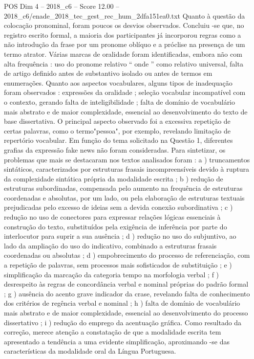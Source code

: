 \begin{textsample}{POS Dim 4 – 2018\_c6 – Score 12.00 – 2018\_c6/enade\_2018\_tec\_gest\_rec\_hum\_2dfa151ea0.txt}
Quanto à questão da colocação pronominal, foram poucos os desvios observados.
Concluiu -se que, no registro escrito formal, a maioria dos participantes já incorporou regras como a não introdução da frase por um pronome oblíquo e a próclise na presença de um termo atrator.
Várias marcas de oralidade foram identificadas, embora não com alta frequência : uso do pronome relativo “ onde ” como relativo universal, falta de artigo definido antes de substantivo isolado ou antes de termos em enumerações.
Quanto aos aspectos vocabulares, alguns tipos de inadequação foram observados : expressões da oralidade ; seleção vocabular incompatível com o contexto, gerando falta de inteligibilidade ; falta de domínio de vocabulário mais abstrato e de maior complexidade, essencial ao desenvolvimento do texto de base dissertativa.
O principal aspecto observado foi a excessiva repetição de certas palavras, como o termo"pessoa", por exemplo, revelando limitação de repertório vocabular.
Em função do tema solicitado na Questão 1, diferentes grafias da expressão fake news não foram consideradas.
Para sintetizar, os problemas que mais se destacaram nos textos analisados foram : a ) truncamentos sintáticos, caracterizados por estruturas frasais incompreensíveis devido à ruptura da complexidade sintática própria da modalidade escrita ; b ) redução de estruturas subordinadas, compensada pelo aumento na frequência de estruturas coordenadas e absolutas, por um lado, ou pela elaboração de estruturas textuais prejudicadas pelo excesso de ideias sem a devida conexão subordinativa ; c ) redução no uso de conectores para expressar relações lógicas essenciais à construção do texto, substituídos pela exigência de inferência por parte do interlocutor para suprir a sua ausência ; d ) redução no uso do subjuntivo, ao lado da ampliação do uso do indicativo, combinado a estruturas frasais coordenadas ou absolutas ; d ) empobrecimento do processo de referenciação, com a repetição de palavras, sem processos mais sofisticados de substituição ; e ) simplificação da marcação da categoria tempo na morfologia verbal ; f ) desrespeito às regras de concordância verbal e nominal próprias do padrão formal ; g ) ausência do acento grave indicador da crase, revelando falta de conhecimento dos critérios de regência verbal e nominal ; h ) falta de domínio de vocabulário mais abstrato e de maior complexidade, essencial ao desenvolvimento do processo dissertativo ; i ) redução do emprego da acentuação gráfica.
Como resultado da correção, merece atenção a constatação de que a modalidade escrita tem apresentado a tendência a uma evidente simplificação, aproximando -se das características da modalidade oral da Língua Portuguesa.

\end{textsample}
